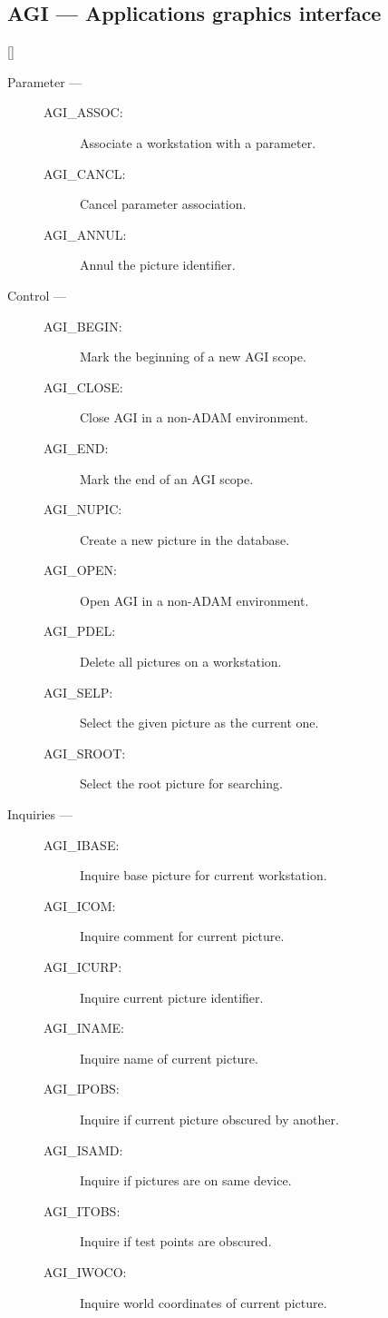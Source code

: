\newpage

\subsection{AGI --- Applications graphics interface}

\vspace{-9mm}

\hfill []

\vspace{2mm}

\begin{description}

\item [Parameter ---]

\begin{description}
\item [AGI\_ASSOC:]  Associate a workstation with a parameter.
\item [AGI\_CANCL:]  Cancel parameter association.
\item [AGI\_ANNUL:]  Annul the picture identifier.
\end{description}

\item [Control ---]

\begin{description}
\item [AGI\_BEGIN:]  Mark the beginning of a new AGI scope.
\item [AGI\_CLOSE:]  Close AGI in a non-ADAM environment.
\item [AGI\_END:]  Mark the end of an AGI scope.
\item [AGI\_NUPIC:]  Create a new picture in the database.
\item [AGI\_OPEN:]  Open AGI in a non-ADAM environment.
\item [AGI\_PDEL:]  Delete all pictures on a workstation.
\item [AGI\_SELP:]  Select the given picture as the current one.
\item [AGI\_SROOT:]  Select the root picture for searching.
\end{description}

\item [Inquiries ---]

\begin{description}
\item [AGI\_IBASE:]  Inquire base picture for current workstation.
\item [AGI\_ICOM:]  Inquire comment for current picture.
\item [AGI\_ICURP:]  Inquire current picture identifier.
\item [AGI\_INAME:]  Inquire name of current picture.
\item [AGI\_IPOBS:]  Inquire if current picture obscured by another.
\item [AGI\_ISAMD:]  Inquire if pictures are on same device.
\item [AGI\_ITOBS:]  Inquire if test points are obscured.
\item [AGI\_IWOCO:]  Inquire world coordinates of current picture.
\end{description}


\end{description}
